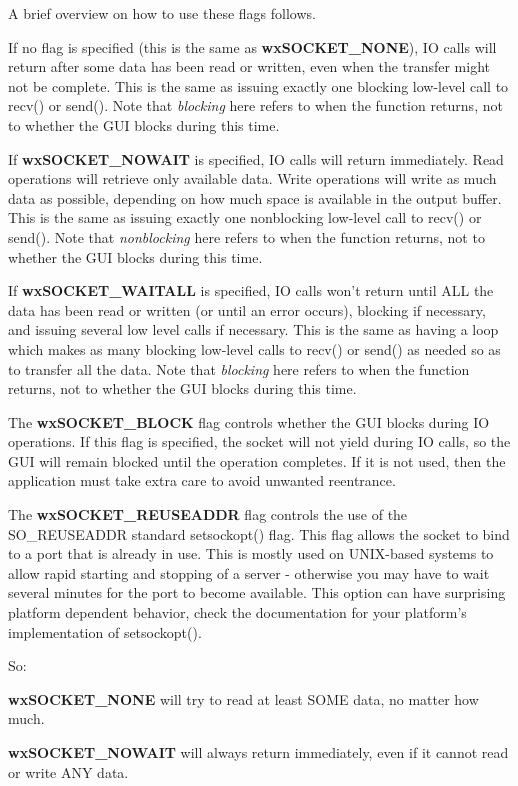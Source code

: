 A brief overview on how to use these flags follows.

If no flag is specified (this is the same as {\bf wxSOCKET\_NONE}),
IO calls will return after some data has been read or written, even
when the transfer might not be complete. This is the same as issuing
exactly one blocking low-level call to recv() or send(). Note
that {\it blocking} here refers to when the function returns, not
to whether the GUI blocks during this time.

If {\bf wxSOCKET\_NOWAIT} is specified, IO calls will return immediately.
Read operations will retrieve only available data. Write operations will
write as much data as possible, depending on how much space is available
in the output buffer. This is the same as issuing exactly one nonblocking
low-level call to recv() or send(). Note that {\it nonblocking} here
refers to when the function returns, not to whether the GUI blocks during
this time.

If {\bf wxSOCKET\_WAITALL} is specified, IO calls won't return until ALL
the data has been read or written (or until an error occurs), blocking if
necessary, and issuing several low level calls if necessary. This is the
same as having a loop which makes as many blocking low-level calls to
recv() or send() as needed so as to transfer all the data. Note
that {\it blocking} here refers to when the function returns, not
to whether the GUI blocks during this time.

The {\bf wxSOCKET\_BLOCK} flag controls whether the GUI blocks during
IO operations. If this flag is specified, the socket will not yield
during IO calls, so the GUI will remain blocked until the operation
completes. If it is not used, then the application must take extra
care to avoid unwanted reentrance.

The {\bf wxSOCKET\_REUSEADDR} flag controls the use of the SO\_REUSEADDR standard
setsockopt() flag. This flag allows the socket to bind to a port that is already in use.
This is mostly used on UNIX-based systems to allow rapid starting and stopping of a server - 
otherwise you may have to wait several minutes for the port to become available.
This option can have surprising platform dependent behavior, check the documentation for
your platform's implementation of setsockopt().

So:

{\bf wxSOCKET\_NONE} will try to read at least SOME data, no matter how much.

{\bf wxSOCKET\_NOWAIT} will always return immediately, even if it cannot
read or write ANY data.

